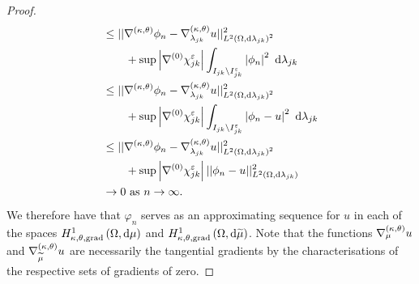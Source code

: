 \begin{proof}
\begin{align*}
		&\leq \norm{ \ktgrad\phi_n - \ktgrad_{\lambda_{jk}}u }_{\ltwo{\ddom}{\lambda_{jk}}^2}^2 \\
		&\qquad + \sup\abs{\ograd\chi_{jk}^\eps}\integral{I_{jk}\setminus I_{jk}^\eps}{ \abs{\phi_n}^2 }{\lambda_{jk}} \\
		&\leq \norm{ \ktgrad\phi_n - \ktgrad_{\lambda_{jk}}u }_{\ltwo{\ddom}{\lambda_{jk}}^2}^2 \\
		&\qquad + \sup\abs{\ograd\chi_{jk}^\eps}\integral{I_{jk}\setminus I_{jk}^\eps}{ \abs{\phi_n - u}^2 }{\lambda_{jk}} \\
		&\leq \norm{ \ktgrad\phi_n - \ktgrad_{\lambda_{jk}}u }_{\ltwo{\ddom}{\lambda_{jk}}^2}^2 \\
		&\qquad + \sup\abs{\ograd\chi_{jk}^\eps}\norm{ \phi_n - u }_{\ltwo{\ddom}{\lambda_{jk}}}^2 \\
		&\rightarrow0 \toInfty{n}.
	\end{align*}
	We therefore have that $\varphi_n$ serves as an approximating sequence for $u$ in each of the spaces $\ktgradSob{\ddom}{\ddmes}$ and $\ktgradSob{\ddom}{\dddmes}$.
	Note that the functions $\ktgrad_{\ddmes}u$ and $\ktgrad_{\dddmes}u$ are necessarily the tangential gradients by the characterisations of the respective sets of gradients of zero.
\end{proof}

